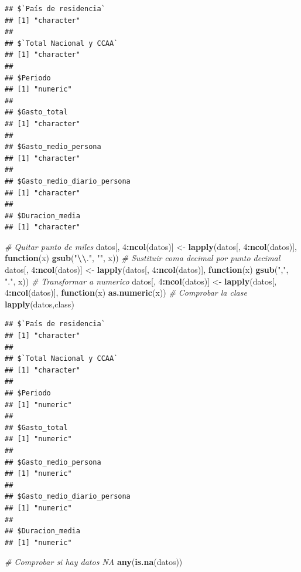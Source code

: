 \documentclass[notspecified,article,submit,moreauthors,pdftex]{Definitions/mdpi}
\newenvironment{Shaded}{\begin{snugshade}}{\end{snugshade}}
\newcommand{\CommentTok}[1]{\textcolor[rgb]{0.56,0.35,0.01}{\textit{#1}}}
\newcommand{\ControlFlowTok}[1]{\textcolor[rgb]{0.13,0.29,0.53}{\textbf{#1}}}
\newcommand{\DecValTok}[1]{\textcolor[rgb]{0.00,0.00,0.81}{#1}}
\newcommand{\FunctionTok}[1]{\textcolor[rgb]{0.13,0.29,0.53}{\textbf{#1}}}
\newcommand{\NormalTok}[1]{#1}
\newcommand{\OtherTok}[1]{\textcolor[rgb]{0.56,0.35,0.01}{#1}}
\newcommand{\SpecialCharTok}[1]{\textcolor[rgb]{0.81,0.36,0.00}{\textbf{#1}}}
\newcommand{\StringTok}[1]{\textcolor[rgb]{0.31,0.60,0.02}{#1}}
\begin{document}
\begin{verbatim}
## $`País de residencia`
## [1] "character"
## 
## $`Total Nacional y CCAA`
## [1] "character"
## 
## $Periodo
## [1] "numeric"
## 
## $Gasto_total
## [1] "character"
## 
## $Gasto_medio_persona
## [1] "character"
## 
## $Gasto_medio_diario_persona
## [1] "character"
## 
## $Duracion_media
## [1] "character"
\end{verbatim}

\begin{Shaded}
\begin{Highlighting}[]
\CommentTok{\# Quitar punto de miles}
\NormalTok{datos[, }\DecValTok{4}\SpecialCharTok{:}\FunctionTok{ncol}\NormalTok{(datos)] }\OtherTok{\textless{}{-}} \FunctionTok{lapply}\NormalTok{(datos[, }\DecValTok{4}\SpecialCharTok{:}\FunctionTok{ncol}\NormalTok{(datos)], }\ControlFlowTok{function}\NormalTok{(x) }\FunctionTok{gsub}\NormalTok{(}\StringTok{"}\SpecialCharTok{\textbackslash{}\textbackslash{}}\StringTok{."}\NormalTok{, }\StringTok{""}\NormalTok{, x))}
\CommentTok{\# Sustituir coma decimal por punto decimal}
\NormalTok{datos[, }\DecValTok{4}\SpecialCharTok{:}\FunctionTok{ncol}\NormalTok{(datos)] }\OtherTok{\textless{}{-}} \FunctionTok{lapply}\NormalTok{(datos[, }\DecValTok{4}\SpecialCharTok{:}\FunctionTok{ncol}\NormalTok{(datos)], }\ControlFlowTok{function}\NormalTok{(x) }\FunctionTok{gsub}\NormalTok{(}\StringTok{","}\NormalTok{, }\StringTok{"."}\NormalTok{, x))}
\CommentTok{\# Transformar a numerico}
\NormalTok{datos[, }\DecValTok{4}\SpecialCharTok{:}\FunctionTok{ncol}\NormalTok{(datos)] }\OtherTok{\textless{}{-}} \FunctionTok{lapply}\NormalTok{(datos[, }\DecValTok{4}\SpecialCharTok{:}\FunctionTok{ncol}\NormalTok{(datos)], }\ControlFlowTok{function}\NormalTok{(x) }\FunctionTok{as.numeric}\NormalTok{(x))}
\CommentTok{\# Comprobar la clase}
\FunctionTok{lapply}\NormalTok{(datos,class)}
\end{Highlighting}
\end{Shaded}

\begin{verbatim}
## $`País de residencia`
## [1] "character"
## 
## $`Total Nacional y CCAA`
## [1] "character"
## 
## $Periodo
## [1] "numeric"
## 
## $Gasto_total
## [1] "numeric"
## 
## $Gasto_medio_persona
## [1] "numeric"
## 
## $Gasto_medio_diario_persona
## [1] "numeric"
## 
## $Duracion_media
## [1] "numeric"
\end{verbatim}

\begin{Shaded}
\begin{Highlighting}[]
\CommentTok{\# Comprobar si hay datos NA}
\FunctionTok{any}\NormalTok{(}\FunctionTok{is.na}\NormalTok{(datos))}
\end{Highlighting}
\end{Shaded}
\end{document}
